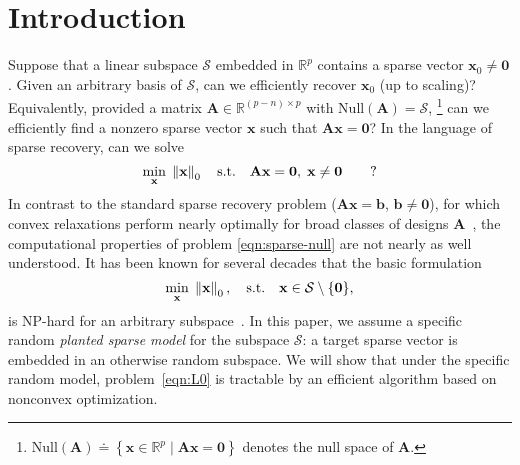 \documentclass[11pt, journal, final]{IEEEtran}
\numberwithin{equation}{section}
\newcommand{\R}{\mathbb{R}}
\newcommand{\mb}{\mathbf}
\newcommand{\mc}{\mathcal}
\newcommand{\bb}{\mathbb}
\newcommand{\norm}[1]{\left\lVert#1\right\rVert}
\newcommand{ \Brac }[1]{\left\lbrace #1 \right\rbrace}
\begin{document}
{\section{Introduction}

Suppose that a linear subspace $\mc S$ embedded in $\R^p$ contains a sparse vector $\mb x_0 \ne \mb 0$. Given an arbitrary basis of $\mc S$, can we efficiently recover $\mb x_0$ (up to scaling)? Equivalently, provided a matrix $\mb A \in \R^{\left(p - n\right) \times p}$ with $\text{Null}(\mb A) = \mc S$, \footnote{ $\text{Null}(\mb A) \doteq \Brac{\mb x\in \bb R^p \mid \mb A \mb x = \mb 0 } $ denotes the null space of $\mb A$.} can we efficiently find a nonzero sparse vector $\mb x$ such that $\mb A \mb x = \mb 0$? In the language of sparse recovery, can we solve
\begin{equation}\label{eqn:sparse-null}
\min_{\mb x} \; \norm{\mb x}_0 \quad \text{s.t.} \quad \mb A \mb x = \mb 0, \; \mb x \ne \mb 0 \qquad {\text ?}
\end{equation}
In contrast to the standard sparse recovery problem ($\mb A \mb x = \mb b$, $\mb b \ne \mb 0$), for which convex relaxations perform nearly optimally for broad classes of designs $\mb A$~\cite{candes2005decoding, donoho2006most}, the computational properties of problem \eqref{eqn:sparse-null} are not nearly as well understood. It has been known for several decades that the basic formulation
\begin{equation} \label{eqn:L0}
\min_{\bf x}\; \norm{\bf x}_0, \quad \text{s.t.} \quad {\bf x}\in \mathcal{S} \setminus \{{\bf 0}\},
\end{equation}
is NP-hard for an arbitrary subspace~\cite{mccormick1983combinatorial, coleman1986null}. In this paper, we assume a specific random \emph{planted sparse model} for the subspace $\mc S$: a target sparse vector is embedded in an otherwise random subspace. We will show that under the specific random model, problem~\eqref{eqn:L0} is tractable by an efficient algorithm based on nonconvex optimization.

}
\end{document}
